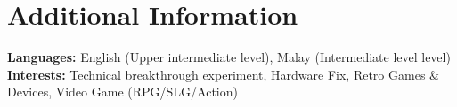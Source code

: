 \section{\textbf{Additional Information}}
\vspace{-0.4mm}
\small{
\textbf{Languages:} English (Upper intermediate level), Malay (Intermediate level level)\\
\textbf{Interests:} Technical breakthrough experiment, Hardware Fix, Retro Games \& Devices, Video Game (RPG/SLG/Action)
}